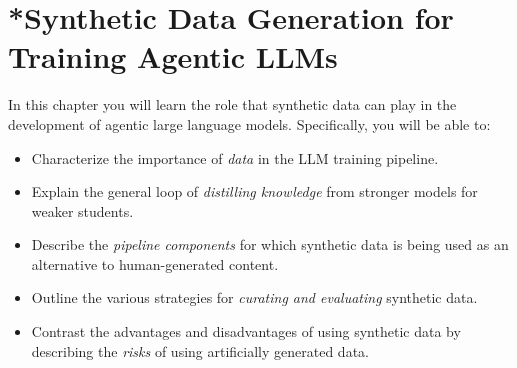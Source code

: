 


\chapter[*Synthetic Data Generation]{*Synthetic Data Generation for Training Agentic LLMs}\label{chap:synthetic-data}


\begin{learningbox}
In this chapter you will learn the role that synthetic data can play in the development of agentic large language models.
Specifically, you will be able to:
\begin{itemize}[leftmargin=*, nosep]
    \item Characterize the importance of {\em data} in the LLM training pipeline.
    \item Explain the general loop of {\em distilling knowledge} from stronger models for weaker students.
    \item Describe the {\em pipeline components} for which synthetic data is being used as an alternative to human-generated content.
    \item Outline the various strategies for {\em curating and evaluating} synthetic data.
    \item Contrast the advantages and disadvantages of using synthetic data by describing the {\em risks} of using artificially generated data.
\end{itemize}
\end{learningbox}

